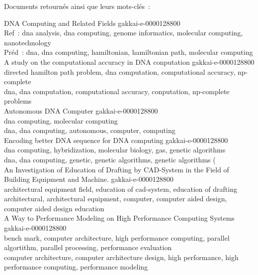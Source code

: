 \iffalse
Documents retournés ainsi que leurs mots-clés~:\\
\begin{mdframed}[backgroundcolor=blue!2, font=\small]

DNA Computing and Related Fields {\small gakkai-e-0000128800}\\
\vspace{0.3em}
Ref~: dna analysis, dna computing, genome informatics, molecular computing, nanotechnology \\
Préd~: dna, dna computing, hamiltonian, hamiltonian path, molecular computing \\

A study on the computational accuracy in DNA conputation {\tiny gakkai-e-0000128800}\\
directed hamilton path problem, dna computation, computational accuracy, np-complete \\
dna, dna computation, computational accuracy, conputation, np-complete problems \\

Autonomous DNA Computer {\small gakkai-e-0000128800}\\
dna computing, molecular computing \\
dna, dna computing, autonomous, computer, computing \\

Encoding better DNA sequence for DNA computing {\small gakkai-e-0000128800}\\
dna computing, hybridization, molecular biology, gas, genetic algorithms \\
dna, dna computing, genetic, genetic algorithms, genetic algorithms ( \\

An Investigation of Education of Drafting by CAD-System in the Field of Building Equipment and Machine. {\small gakkai-e-0000128800}\\
architectural equipment field, education of cad-system, education of drafting \\
architectural, architectural equipment, computer, computer aided design, computer aided design education \\

A Way to Performance Modeling on High Performance Computing Systems {\small gakkai-e-0000128800}\\
bench mark, computer architecture, high performance computing, parallel algortithm, parallel processing, performance evaluation \\
computer architecture, computer architecture design, high performance, high performance computing, performance modeling \\


\end{mdframed}
